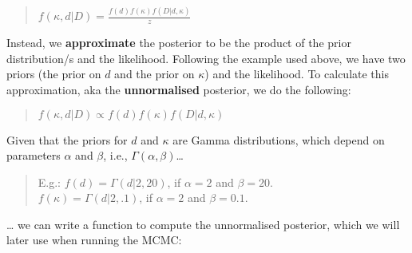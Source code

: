 \documentclass[
]{article}
\begin{document}
\begin{quote}
\(f(\kappa,d|D)=\frac{f(d)f(\kappa)f(D|d,\kappa)}{z}\)
\end{quote}

Instead, we \textbf{approximate} the posterior to be the product of the
prior distribution/s and the likelihood. Following the example used
above, we have two priors (the prior on \(d\) and the prior on
\(\kappa\)) and the likelihood. To calculate this approximation, aka the
\textbf{unnormalised} posterior, we do the following:

\begin{quote}
\(f(\kappa,d|D)\propto f(d)f(\kappa)f(D|d,\kappa)\)
\end{quote}

Given that the priors for \(d\) and \(\kappa\) are Gamma distributions,
which depend on parameters \(\alpha\) and \(\beta\), i.e.,
\(\Gamma(\alpha,\beta)\)\ldots{}

\begin{quote}
E.g.: \(f(d)=\Gamma(d|2,20)\), if \(\alpha=2\) and \(\beta=20\).\\
\(f(\kappa)=\Gamma(d|2,.1)\), if \(\alpha=2\) and \(\beta=0.1\).
\end{quote}

\ldots{} we can write a function to compute the unnormalised posterior,
which we will later use when running the MCMC:
\end{document}
